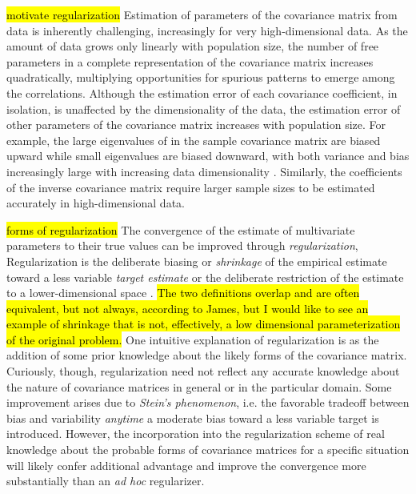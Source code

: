 \hl{\tiny motivate regularization} Estimation of parameters of the covariance matrix from data is inherently challenging, increasingly for very high-dimensional data. As the amount of data grows only linearly with population size, the number of free parameters in a complete representation of the covariance matrix increases quadratically, multiplying opportunities for spurious patterns to emerge among the correlations. 
Although the estimation error of each covariance coefficient, in isolation, is unaffected by the dimensionality of the data, the estimation error of other parameters of the covariance matrix increases with population size.  
For example, the large eigenvalues of in the sample covariance matrix are biased upward while small eigenvalues are biased downward, with both variance and bias increasingly large with increasing data dimensionality \citep{Hayes:1981}.  Similarly, the coefficients of the inverse covariance matrix require  larger sample sizes to be estimated accurately in high-dimensional data.

\hl{\tiny forms of regularization} The convergence of the estimate of multivariate parameters to their true values can be improved through \emph{regularization},  Regularization is the deliberate biasing or \emph{shrinkage} of the empirical estimate toward a less variable \emph{target estimate} \citep{Schafer:2005} or the deliberate restriction of the estimate to a lower-dimensional space \citep{Dempster:1972,Fan:2008,Friedman:2008,Rothman:2008}. 
\hl{\tiny The two definitions overlap and are often equivalent, but not always, according to James, but I would like to see an example of shrinkage that is not, effectively, a low dimensional parameterization of the original problem.} 
One intuitive explanation of regularization is as the addition of some  prior knowledge about the likely forms of the covariance matrix. Curiously, though, regularization need not reflect any accurate knowledge about the nature of covariance matrices in general or in the particular domain. Some improvement arises due to \emph{Stein's phenomenon}, i.e. the favorable tradeoff between bias and variability \emph{anytime} a moderate bias toward a less variable target is introduced.  
However, the incorporation into the regularization scheme of real knowledge about the probable forms of covariance matrices for a specific situation will likely confer additional advantage and improve the convergence more substantially than an \emph{ad hoc} regularizer.

